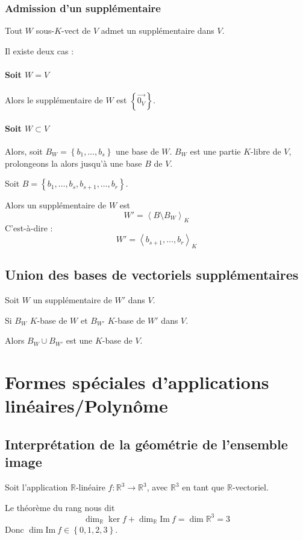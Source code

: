 \documentclass[a4paper,10pt]{article}
\newcommand{\ap}{ \rightarrow} %
\newcommand{\grp}[1]{\left\langle #1 \right\rangle} %
\newcommand{\set}[1]{\left\lbrace #1 \right\rbrace } %
\newcommand{\im}{\mathrm{Im}\:} %
\begin{document}
   \subsubsection{Admission d'un supplémentaire}\label{admitsuppl}
    Tout $W$ sous-$K$-vect de $V$ admet un supplémentaire dans $V$.

    Il existe deux cas :
    \paragraph{Soit $W=V$}
     Alors le supplémentaire de $W$ est $\set{\vec{0_V}}$.

    \paragraph{Soit $W \subset V$}
     Alors, soit $B_W=\set{b_1, \hdots, b_s}$ une base de $W$. $B_W$ est une partie $K$-libre de $V$, prolongeons la alors jusqu'à une base $B$ de $V$.

     Soit $B=\set{b_1, \hdots, b_s, b_{s+1}, \hdots, b_r}$.

     Alors un supplémentaire de $W$ est $$W'=\grp{B \setminus B_W}_K$$
     C'est-à-dire : $$W' = \grp{b_{s+1}, \hdots, b_r}_K$$


  \subsection{Union des bases de vectoriels supplémentaires}
   Soit $W$ un supplémentaire de $W'$ dans $V$.

   Si $B_W$ $K$-base de $W$ et $B_{W'}$ $K$-base de $W'$ dans $V$.

   Alors $B_W \cup B_{W'}$ est une $K$-base de $V$.

 \section{Formes spéciales d'applications linéaires/Polynôme}
  \subsection{Interprétation de la géométrie de l'ensemble image}
   Soit l'application $\mathbb{R}$-linéaire $f : \mathbb{R}^3 \ap \mathbb{R}^3$, avec $\mathbb{R}^3$ en tant que $\mathbb{R}$-vectoriel.

   Le théorème du rang nous dit $$\dim_\mathbb{R} \ker f + \dim_\mathbb{R} \im f = \dim \mathbb{R}^3 = 3$$
   Donc $\dim \im f \in \set{0,1,2,3}$.
\end{document}
